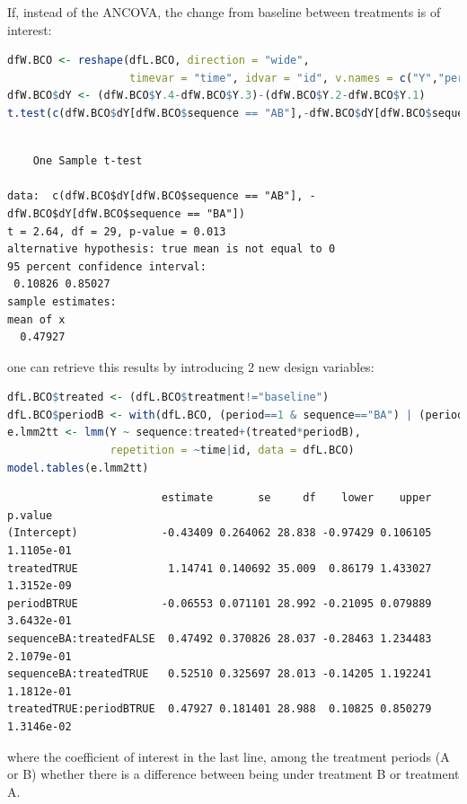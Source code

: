 \documentclass[12pt]{article}
\begin{document}
\noindent If, instead of the ANCOVA, the change from baseline between
treatments is of interest:
\begin{lstlisting}[language=r,numbers=none]
dfW.BCO <- reshape(dfL.BCO, direction = "wide",
                   timevar = "time", idvar = "id", v.names = c("Y","period","treatment"))
dfW.BCO$dY <- (dfW.BCO$Y.4-dfW.BCO$Y.3)-(dfW.BCO$Y.2-dfW.BCO$Y.1)
t.test(c(dfW.BCO$dY[dfW.BCO$sequence == "AB"],-dfW.BCO$dY[dfW.BCO$sequence == "BA"]))
\end{lstlisting}

\label{}
\begin{verbatim}

	One Sample t-test

data:  c(dfW.BCO$dY[dfW.BCO$sequence == "AB"], -dfW.BCO$dY[dfW.BCO$sequence == "BA"])
t = 2.64, df = 29, p-value = 0.013
alternative hypothesis: true mean is not equal to 0
95 percent confidence interval:
 0.10826 0.85027
sample estimates:
mean of x 
  0.47927
\end{verbatim}

one can retrieve this results by introducing 2 new design variables:
\begin{lstlisting}[language=r,numbers=none]
dfL.BCO$treated <- (dfL.BCO$treatment!="baseline")
dfL.BCO$periodB <- with(dfL.BCO, (period==1 & sequence=="BA") | (period==2 & sequence=="AB"))
e.lmm2tt <- lmm(Y ~ sequence:treated+(treated*periodB),
                repetition = ~time|id, data = dfL.BCO)
model.tables(e.lmm2tt)
\end{lstlisting}

\label{}
\begin{verbatim}
                        estimate       se     df    lower    upper    p.value
(Intercept)             -0.43409 0.264062 28.838 -0.97429 0.106105 1.1105e-01
treatedTRUE              1.14741 0.140692 35.009  0.86179 1.433027 1.3152e-09
periodBTRUE             -0.06553 0.071101 28.992 -0.21095 0.079889 3.6432e-01
sequenceBA:treatedFALSE  0.47492 0.370826 28.037 -0.28463 1.234483 2.1079e-01
sequenceBA:treatedTRUE   0.52510 0.325697 28.013 -0.14205 1.192241 1.1812e-01
treatedTRUE:periodBTRUE  0.47927 0.181401 28.988  0.10825 0.850279 1.3146e-02
\end{verbatim}


where the coefficient of interest in the last line, among the
treatment periods (A or B) whether there is a difference between being
under treatment B or treatment A.

\clearpage
\end{document}

